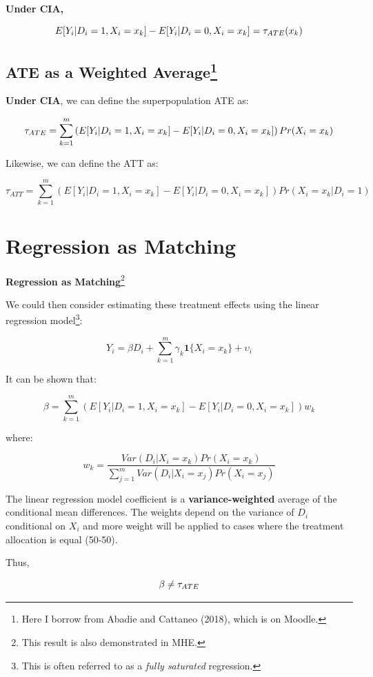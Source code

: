 \documentclass[
  letterpaper,
  DIV=11,
  numbers=noendperiod]{scrreprt}
\theoremstyle{definition}
\theoremstyle{remark}
\begin{document}
\textbf{Under CIA,}

\[
E[Y_i|D_i=1, X_i=x_k] - E[Y_i|D_i=0, X_i=x_k] = \tau_{\scriptsize{ATE}}(x_k)
\]

\section[ATE as a Weighted Average]{\texorpdfstring{ATE as a Weighted
Average\footnote{Here I borrow from Abadie and Cattaneo (2018), which is
  on Moodle.}}{ATE as a Weighted Average}}\label{ate-as-a-weighted-averagecef-2}

\textbf{Under CIA}, we can define the superpopulation ATE as:

\[
\tau_{\scriptsize{ATE}} = \sum_{k=1}^{m} \left(E[Y_i|D_i=1, X_i=x_k] - E[Y_i|D_i=0, X_i=x_k]\right)Pr(X_i=x_k)
\]

Likewise, we can define the ATT as:

\[
\tau_{ATT} = \sum_{k=1}^{m} \left(E[Y_i|D_i=1, X_i=x_k] - E[Y_i|D_i=0, X_i=x_k]\right)Pr(X_i=x_k|D_i=1)
\]

\chapter{Regression as Matching}\label{regression-as-matching}

\textbf{Regression as Matching}\footnote{This result is also
  demonstrated in MHE.}

We could then consider estimating these treatment effects using the
linear regression model\footnote{This is often referred to as a
  \emph{fully saturated} regression.}:

\[
Y_i = \beta D_i + \sum_{k=1}^{m} \gamma_k \mathbf{1}\{X_i=x_k\} + \upsilon_i
\]

It can be shown that:

\[
\beta = \sum_{k=1}^{m} \left(E[Y_i|D_i=1, X_i=x_k] - E[Y_i|D_i=0, X_i=x_k]\right)w_k
\]

where:

\[
w_k = \frac{Var(D_i|X_i=x_k)Pr(X_i=x_k)}{\sum_{j=1}^{m} Var(D_i|X_i=x_j)Pr(X_i=x_j)}
\]

The linear regression model coefficient is a \textbf{variance-weighted}
average of the conditional mean differences. The weights depend on the
variance of \(D_i\) conditional on \(X_i\) and more weight will be
applied to cases where the treatment allocation is equal (50-50).

Thus,

\[
\beta \neq \tau_{\scriptsize{ATE}}
\]
\end{document}
